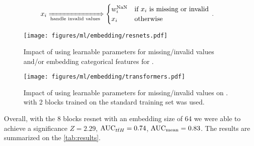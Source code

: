 \begin{equation}
    x_i \xRightarrow[\text{handle invalid values}]{} \begin{cases}
        w^\text{NaN}_i & \text{if } x_i \text{ is missing or invalid} \\
        x_i            & \text{otherwise}
    \end{cases}\,.
\end{equation}

\begin{figure}[htb]
    \centering
    \texttt{[image: figures/ml/embedding/resnets.pdf]}
    \caption[Impact of using learnable parameters for missing/invalid values and/or embedding categorical features for .]
    {Impact of using learnable parameters for missing/invalid values and/or embedding categorical features for . \transplot}
    \label{fig:learnable-nan-w-resnets}
\end{figure}

\begin{figure}[htb]
    \centering
    \texttt{[image: figures/ml/embedding/transformers.pdf]}
    \caption[Impact of using learnable parameters for missing/invalid values on .]
    {Impact of using learnable parameters for missing/invalid values on \ftts. \ftt with 2 blocks trained on the
        standard training set \ttrn was used. \transplot}
    \label{fig:learnable-nan-w-transformers}
\end{figure}

Overall, with the 8 blocks \gls{resnet} with an embedding size of 64 we were able to achieve a significance $Z = 2.29$,
$\text{AUC}_{t\bar{t}H} = 0.74$, $\text{AUC}_\text{mean} = 0.83$. The results are summarized on the \autoref{tab:results}.

